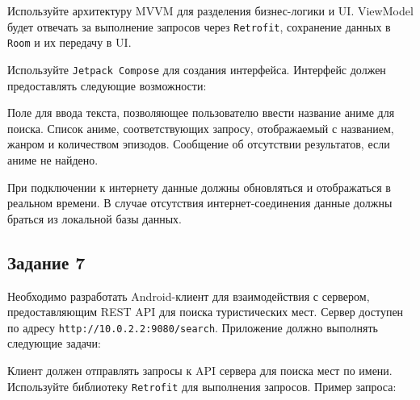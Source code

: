 \documentclass[a4paper,12pt]{article}
\begin{document}
Используйте архитектуру MVVM для разделения бизнес-логики и UI. ViewModel будет отвечать за выполнение запросов через \texttt{Retrofit}, сохранение данных в \texttt{Room} и их передачу в UI.


Используйте \texttt{Jetpack Compose} для создания интерфейса. Интерфейс должен предоставлять следующие возможности:

Поле для ввода текста, позволяющее пользователю ввести название аниме для поиска.
Список аниме, соответствующих запросу, отображаемый с названием, жанром и количеством эпизодов.
Сообщение об отсутствии результатов, если аниме не найдено.

При подключении к интернету данные должны обновляться и отображаться в реальном времени.
В случае отсутствия интернет-соединения данные должны браться из локальной базы данных.


\subsection*{Задание 7}

Необходимо разработать Android-клиент для взаимодействия с сервером, предоставляющим REST API для поиска туристических мест. Сервер доступен по адресу \texttt{http://10.0.2.2:9080/search}. Приложение должно выполнять следующие задачи:


Клиент должен отправлять запросы к API сервера для поиска мест по имени. Используйте библиотеку \texttt{Retrofit} для выполнения запросов. Пример запроса:
\end{document}
